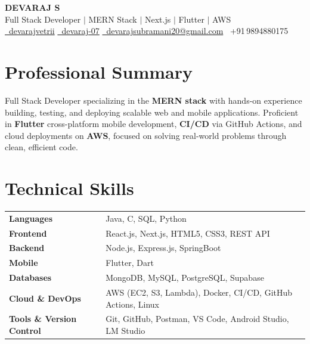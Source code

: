 \documentclass[a4paper,11pt]{article}
\begin{document}
\pagestyle{empty}

\begin{center}
  {\large \textbf{DEVARAJ S}}\\[2pt]
  {\footnotesize Full Stack Developer $|$ MERN Stack $|$ Next.js $|$ Flutter $|$ AWS}\\[3pt]
  \footnotesize
  \href{https://linkedin.com/in/devarajvetrii}{\faLinkedin\ devarajvetrii} \;\;
  \href{https://github.com/DEVARAJ-07}{\faGithub\ devaraj-07} \;\;
  \href{mailto:devarajsubramani20@gmail.com}{\faEnvelope\ devarajsubramani20@gmail.com} \;\;
  \faPhone\ +91\,9894880175
\end{center}

\vspace{0.5pt}

\section{Professional Summary}
{\small
Full Stack Developer specializing in the \textbf{MERN stack} with hands-on experience building, testing, and deploying scalable web and mobile applications.
Proficient in \textbf{Flutter} cross-platform mobile development, \textbf{CI/CD} via GitHub Actions, and cloud deployments on \textbf{AWS}, focused on solving real-world problems through clean, efficient code.
}

\section{Technical Skills}
{\small
\begin{tabularx}{\linewidth}{@{} l X @{}}
  \textbf{Languages}               & Java, C, SQL, Python\\[2pt]
  \textbf{Frontend}                & React.js, Next.js, HTML5, CSS3, REST API  \\[2pt]
  \textbf{Backend}                 & Node.js, Express.js, SpringBoot \\[2pt]
  \textbf{Mobile}                  & Flutter, Dart \\[2pt]
  \textbf{Databases}               & MongoDB, MySQL, PostgreSQL, Supabase \\[2pt]
  \textbf{Cloud \& DevOps}         & AWS (EC2, S3, Lambda), Docker, CI/CD, GitHub Actions, Linux \\[2pt]
  \textbf{Tools \& Version Control}& Git, GitHub, Postman, VS Code, Android Studio, LM Studio \\
\end{tabularx}
}
\end{document}
